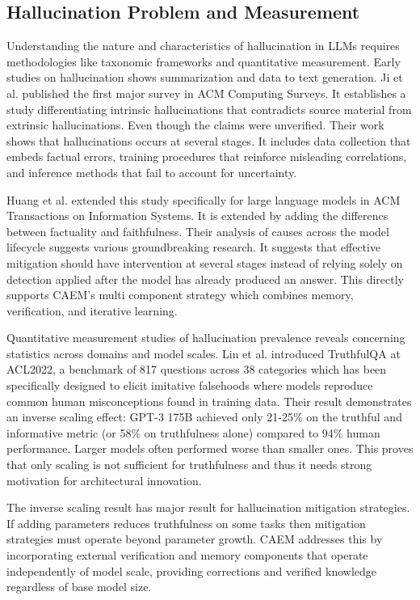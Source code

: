 \subsection{Hallucination Problem and Measurement}

Understanding the nature and characteristics of hallucination in LLMs requires methodologies like taxonomic frameworks and quantitative measurement. Early studies on hallucination shows summarization and data to text generation. Ji et al. \cite{ji2023survey} published the first major survey in ACM Computing Surveys. It establishes a study differentiating intrinsic hallucinations that contradicts source material from extrinsic hallucinations. Even though the claims were unverified. Their work shows that hallucinations occurs at several stages. It includes data collection that embeds factual errors, training procedures that reinforce misleading correlations, and inference methods that fail to account for uncertainty.

Huang et al. \cite{10.1145/3649506} extended this study specifically for large language models in ACM Transactions on Information Systems. It is extended by adding the differencs between factuality and faithfulness. Their analysis of causes across the model lifecycle suggests various groundbreaking research. It suggests that effective mitigation should have intervention at several stages instead of relying solely on detection applied after the model has already produced an answer. This directly supports CAEM's multi component strategy which combines memory, verification, and iterative learning.

Quantitative measurement studies of hallucination prevalence reveals concerning statistics across domains and model scales. Lin et al. \cite{lin-etal-2022-truthfulqa} introduced TruthfulQA at ACL2022, a benchmark of 817 questions across 38 categories which has been specifically designed to elicit imitative falsehoods where models reproduce common human misconceptions found in training data. Their result demonstrates an inverse scaling effect: GPT-3 175B achieved only 21-25\% on the truthful and informative metric (or 58\% on truthfulness alone) compared to 94\% human performance. Larger models often performed worse than smaller ones. This proves that only scaling is not sufficient for truthfulness and thus it needs strong motivation for architectural innovation.

The inverse scaling result has major result for hallucination mitigation strategies. If adding parameters reduces truthfulness on some tasks then mitigation strategies must operate beyond parameter growth. CAEM addresses this by incorporating external verification and memory components that operate independently of model scale, providing corrections and verified knowledge regardless of base model size.

